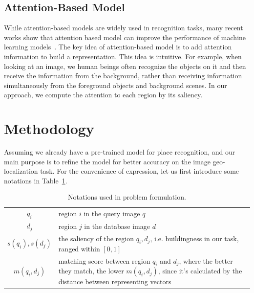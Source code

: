 \subsection{Attention-Based Model}
While attention-based models are widely used in recognition tasks, many recent works show that attention based model can improve the performance of machine learning models~\cite{mnih2014recurrent, zheng2015neural}. The key idea of attention-based model is to add attention information to build a representation. This idea is intuitive. For example, when looking at an image, we human beings often recognize the objects on it and then receive the information from the background, rather than receiving information simultaneously from the foreground objects and background scenes. In our approach, we compute the attention to each region by its saliency. 
\section{Methodology}
Assuming we already have a pre-trained model for place recognition, and our main purpose is to refine the model for better accuracy on the image geo-localization task. For the convenience of expression, let us first introduce some notations in Table~\ref{table:notations}. 
\begin{table}
\begin{center}
\begin{tabular}{|c|p{}|}
\hline
$q_i$ & region $i$ in the query image $q$\\[0.2cm]
$d_j$ & region $j$ in the database image $d$\\[0.2cm]
$s(q_i), s(d_j)$ & the saliency of the region $q_i, d_j$, i.e. buildingness in our
task, ranged within $[0,1]$ \\[0.2cm]
$m(q_i, d_j)$ & matching score between region $q_i$ and $d_j$, where the better they match, the lower $m(q_i,d_j)$, since it's calculated by the distance between representing vectors\\[0.2cm]
\hline
\end{tabular}
\end{center}
\caption{Notations used in problem formulation.}
\label{table:notations}
\end{table}
